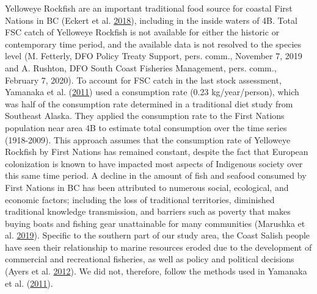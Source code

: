 \documentclass[11pt]{book}
\begin{document}
\hypertarget{sec:fsc-catch-data}{%
\label{sec:fsc-catch-data}}

Yelloweye Rockfish are an important traditional food source for coastal First Nations in BC (Eckert et al. \protect\hyperlink{ref-eckert2018}{2018}), including in the inside waters of 4B. Total FSC catch of Yelloweye Rockfish is not available for either the historic or contemporary time period, and the available data is not resolved to the species level (M. Fetterly, DFO Policy Treaty Support, pers. comm., November 7, 2019 and A. Rushton, DFO South Coast Fisheries Management, pers. comm., February 7, 2020). To account for FSC catch in the last stock assessment, Yamanaka et al. (\protect\hyperlink{ref-yamanaka2011}{2011}) used a consumption rate (0.23 kg/year/person), which was half of the consumption rate determined in a traditional diet study from Southeast Alaska. They applied the consumption rate to the First Nations population near area 4B to estimate total consumption over the time series (1918-2009). This approach assumes that the consumption rate of Yelloweye Rockfish by First Nations has remained constant, despite the fact that European colonization is known to have impacted most aspects of Indigenous society over this same time period. A decline in the amount of fish and seafood consumed by First Nations in BC has been attributed to numerous social, ecological, and economic factors; including the loss of traditional territories, diminished traditional knowledge transmission, and barriers such as poverty that makes buying boats and fishing gear unattainable for many communities (Marushka et al. \protect\hyperlink{ref-marushka2019}{2019}). Specific to the southern part of our study area, the Coast Salish people have seen their relationship to marine resources eroded due to the development of commercial and recreational fisheries, as well as policy and political decisions (Ayers et al. \protect\hyperlink{ref-ayers2012}{2012}). We did not, therefore, follow the methods used in Yamanaka et al. (\protect\hyperlink{ref-yamanaka2011}{2011}).
\end{document}
